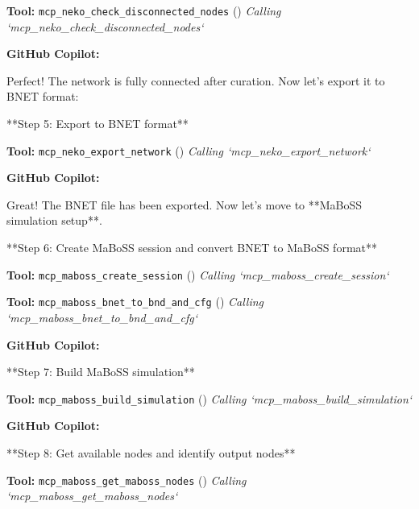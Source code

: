 \documentclass[11pt,a4paper]{article}
\begin{document}
\begin{toolokbox}
\textbf{Tool:} \texttt{mcp\_neko\_check\_disconnected\_nodes} (\checkmark)
\textit{Calling `mcp\_neko\_check\_disconnected\_nodes`}
\end{toolokbox}
\begin{copilotbox}
\textbf{GitHub Copilot:}

Perfect! The network is fully connected after curation. Now let's export it to BNET format:

**Step 5: Export to BNET format**

\end{copilotbox}
\begin{toolokbox}
\textbf{Tool:} \texttt{mcp\_neko\_export\_network} (\checkmark)
\textit{Calling `mcp\_neko\_export\_network`}
\end{toolokbox}
\begin{copilotbox}
\textbf{GitHub Copilot:}

Great! The BNET file has been exported. Now let's move to **MaBoSS simulation setup**.

**Step 6: Create MaBoSS session and convert BNET to MaBoSS format**

\end{copilotbox}
\begin{toolokbox}
\textbf{Tool:} \texttt{mcp\_maboss\_create\_session} (\checkmark)
\textit{Calling `mcp\_maboss\_create\_session`}
\end{toolokbox}
\begin{toolokbox}
\textbf{Tool:} \texttt{mcp\_maboss\_bnet\_to\_bnd\_and\_cfg} (\checkmark)
\textit{Calling `mcp\_maboss\_bnet\_to\_bnd\_and\_cfg`}
\end{toolokbox}
\begin{copilotbox}
\textbf{GitHub Copilot:}

**Step 7: Build MaBoSS simulation**

\end{copilotbox}
\begin{toolokbox}
\textbf{Tool:} \texttt{mcp\_maboss\_build\_simulation} (\checkmark)
\textit{Calling `mcp\_maboss\_build\_simulation`}
\end{toolokbox}
\begin{copilotbox}
\textbf{GitHub Copilot:}

**Step 8: Get available nodes and identify output nodes**

\end{copilotbox}
\begin{toolokbox}
\textbf{Tool:} \texttt{mcp\_maboss\_get\_maboss\_nodes} (\checkmark)
\textit{Calling `mcp\_maboss\_get\_maboss\_nodes`}
\end{toolokbox}
\end{document}
